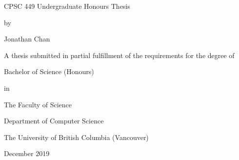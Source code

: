 \makeatletter
\thispagestyle{empty}
\vspace*{\fill}
\begin{center}
\begin{minipage}{0.7\linewidth}
	\centering
	{\Huge \@title \par}
	\vspace{1em}
	{\Large CPSC 449 Undergraduate Honours Thesis \par}
	\vspace{1em}
    {by \par}
	{\huge Jonathan Chan \par}
    \vspace{2em}
	{\Large A thesis submitted in partial fulfillment of the requirements for the degree of \par}
	\vspace{1em}
    {\huge Bachelor of Science (Honours) \par}
	\vspace{2em}
    {in \par}
	\vspace{2em}
    {\Large The Faculty of Science \par}
	\vspace{1em}
    {\Large Department of Computer Science \par}
    \vspace{1em}
    {\Large The University of British Columbia (Vancouver) \par}
    \vspace{1em}
	{\Large December 2019}
\end{minipage}
\end{center}
\vspace*{\fill}
\clearpage
\makeatother